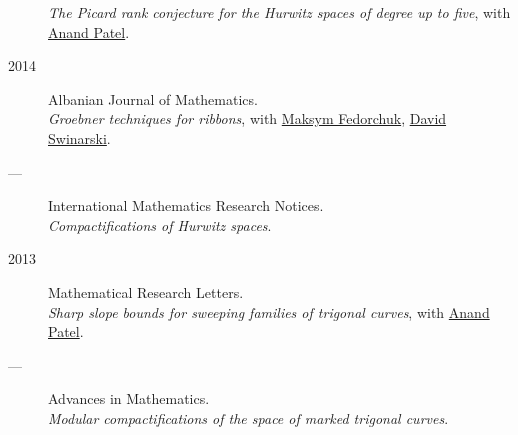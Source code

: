 \documentclass[11pt]{article}
\begin{document}
\begin{description}
\emph{The Picard rank conjecture for the Hurwitz spaces of degree up to five}, with \href{https://www2.bc.edu/anand-p-patel/}{Anand Patel}.
\item[{2014}] Albanian Journal of Mathematics.\\
\emph{Groebner techniques for ribbons}, with \href{https://www2.bc.edu/maksym-fedorchuk/}{Maksym Fedorchuk}, \href{http://faculty.fordham.edu/dswinarski/}{David Swinarski}.
\item[{---}] International Mathematics Research Notices.\\
\emph{Compactifications of Hurwitz spaces}.
\item[{2013}] Mathematical Research Letters.\\
\emph{Sharp slope bounds for sweeping families of trigonal curves}, with \href{https://sites.google.com/view/anand-patel}{Anand Patel}.
\item[{---}] Advances in Mathematics.\\
\emph{Modular compactifications of the space of marked trigonal curves}.
\end{description}
\end{document}
